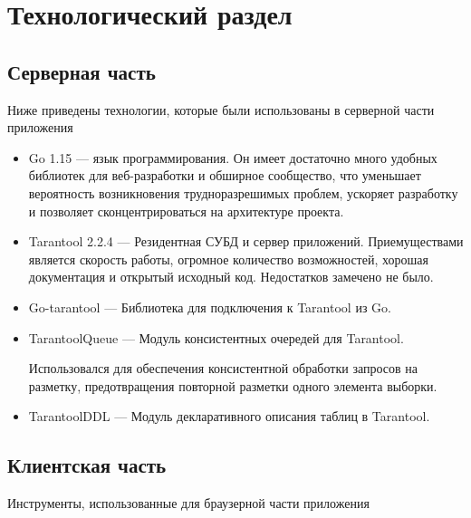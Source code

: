 \section{Технологический раздел}

\subsection{Серверная часть}

Ниже приведены технологии, которые были использованы в серверной части приложения

\begin{itemize}
    \item Go 1.15\cite{godoc} --- язык программирования. 
    Он имеет достаточно много удобных библиотек для веб-разработки и
    обширное сообщество, что уменьшает вероятность возникновения 
    трудноразрешимых проблем, ускоряет разработку и позволяет 
    сконцентрироваться на архитектуре проекта.

    \item Tarantool 2.2.4\cite{tarantooldoc} --- Резидентная СУБД и сервер приложений.
    Приемуществами является скорость работы, 
    огромное количество возможностей,
    хорошая документация и открытый исходный код.
    Недостатков замечено не было.

    \item Go-tarantool\cite{go-tarantool} --- Библиотека для подключения к Tarantool из Go.
    
    \item TarantoolQueue\cite{tarantooldoc} --- Модуль консистентных 
    очередей для Tarantool.

    Использовался для обеспечения консистентной обработки запросов на разметку, предотвращения 
    повторной разметки одного
    элемента выборки.
    
    \item TarantoolDDL\cite{tarantooldoc} --- Модуль декларативного описания таблиц в Tarantool. 
\end{itemize}

\subsection{Клиентская часть}

Инструменты, использованные для браузерной части приложения


